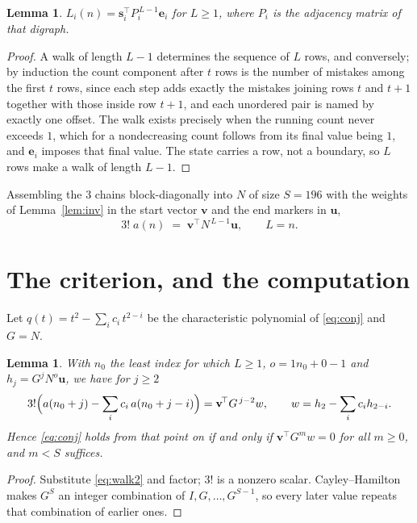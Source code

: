 \documentclass[11pt,a4paper]{article}
\theoremstyle{plain}
\newtheorem{lemma}[theorem]{Lemma}
\theoremstyle{definition}
\begin{document}
\begin{lemma}\label{lem:walk}
$L_i(n)=\mathbf{s}_i^{\!\top}P_i^{\,L-1}\mathbf{e}_i$ for $L\ge1$, where $P_i$ is the
adjacency matrix of that digraph.
\end{lemma}

\begin{proof}
A walk of length $L-1$ determines the sequence of $L$ rows, and conversely; by induction
the count component after $t$ rows is the number of mistakes among the first $t$ rows,
since each step adds exactly the mistakes joining rows $t$ and $t+1$ together with those
inside row $t+1$, and each unordered pair is named by exactly one offset. The walk exists
precisely when the running count never exceeds $1$, which for a nondecreasing count follows
from its final value being $1$, and $\mathbf{e}_i$ imposes that final value. The state
carries a row, not a boundary, so $L$ rows make a walk of length $L-1$.
\end{proof}

Assembling the $3$ chains block-diagonally into $N$ of size $S=196$ with the weights of
Lemma~\ref{lem:inv} in the start vector $\mathbf{v}$ and the end markers in
$\mathbf{u}$,
\begin{equation}\label{eq:walk2}
3!\;a(n)\;=\;\mathbf{v}^{\!\top}N^{\,L-1}\mathbf{u},\qquad L=n .
\end{equation}

\section{The criterion, and the computation}

Let $q(t)=t^{2}-\sum_i c_i\,t^{2-i}$ be the characteristic polynomial of
\eqref{eq:conj} and $G=N$.

\begin{lemma}\label{lem:crit}
With $n_0$ the least index for which $L\ge1$, $o=1n_0+0-1$ and
$h_j=G^{j}N^{o}\mathbf{u}$, we have for $j\ge2$
\[
3!\Bigl(a(n_0+j)-\sum_i c_i\,a(n_0+j-i)\Bigr)=\mathbf{v}^{\!\top}G^{\,j-2}w,
\qquad w=h_{2}-\sum_i c_ih_{2-i} .
\]
Hence \eqref{eq:conj} holds from that point on if and only if
$\mathbf{v}^{\!\top}G^{m}w=0$ for all $m\ge0$, and $m<S$ suffices.
\end{lemma}

\begin{proof}
Substitute \eqref{eq:walk2} and factor; $3!$ is a nonzero scalar. Cayley--Hamilton
makes $G^{S}$ an integer combination of $I,G,\dots,G^{S-1}$, so every later value repeats
that combination of earlier ones.
\end{proof}
\end{document}
